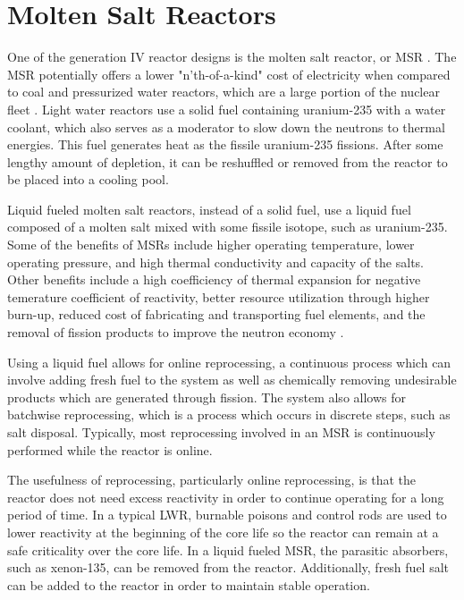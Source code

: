 
\section{Molten Salt Reactors}

One of the generation IV reactor designs is the molten salt reactor, or MSR \cite{kelly_generation_2014}. The MSR potentially offers a lower "n'th-of-a-kind" cost of electricity when compared to coal and pressurized water reactors, which are a large portion of the nuclear fleet \cite{moir_cost_2002}. 
Light water reactors use a solid fuel containing uranium-235 with a water coolant, which also serves as a moderator to slow down the neutrons to thermal energies. This fuel generates heat as the fissile uranium-235 fissions. After some lengthy amount of depletion, it can be reshuffled or removed from the reactor to be placed into a cooling pool.

Liquid fueled molten salt reactors, instead of a solid fuel, use a liquid fuel composed of a molten salt mixed with some fissile isotope, such as uranium-235. Some of the benefits of MSRs include higher operating temperature, lower operating pressure, and high thermal conductivity and capacity of the salts. Other benefits include a high coefficiency of thermal expansion for negative temerature coefficient of reactivity, better resource utilization through higher burn-up, reduced cost of fabricating and transporting fuel elements, and the removal of fission products to improve the neutron economy \cite{serp_molten_2014}.

Using a liquid fuel allows for online reprocessing, a continuous process which can involve adding fresh fuel to the system as well as chemically removing undesirable products which are generated through fission. The system also allows for batchwise reprocessing, which is a process which occurs in discrete steps, such as salt disposal. Typically, most reprocessing involved in an MSR is continuously performed while the reactor is online.

The usefulness of reprocessing, particularly online reprocessing, is that the reactor does not need excess reactivity in order to continue operating for a long period of time. In a typical LWR, burnable poisons and control rods are used to lower reactivity at the beginning of the core life so the reactor can remain at a safe criticality over the core life. In a liquid fueled MSR, the parasitic absorbers, such as xenon-135, can be removed from the reactor. Additionally, fresh fuel salt can be added to the reactor in order to maintain stable operation.

